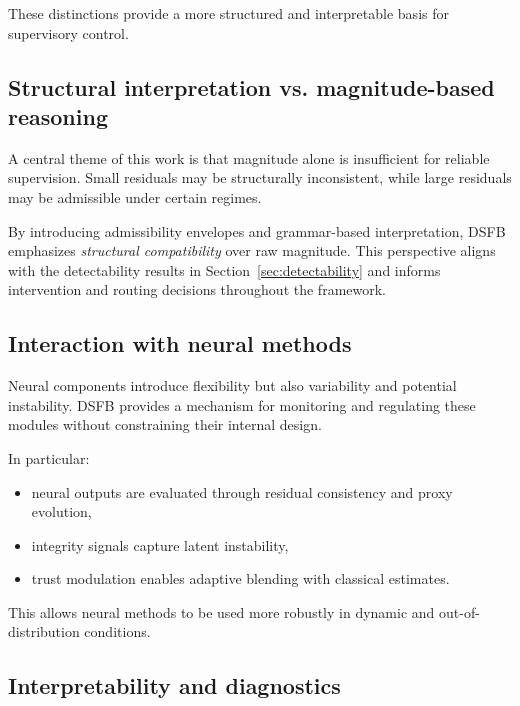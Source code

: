 \documentclass[11pt]{article}
\theoremstyle{definition}
\theoremstyle{plain}
\begin{document}
These distinctions provide a more structured and interpretable basis for supervisory control.


\subsection{Structural interpretation vs. magnitude-based reasoning}

A central theme of this work is that magnitude alone is insufficient for reliable supervision. Small residuals may be structurally inconsistent, while large residuals may be admissible under certain regimes.

By introducing admissibility envelopes and grammar-based interpretation, DSFB emphasizes \emph{structural compatibility} over raw magnitude. This perspective aligns with the detectability results in Section~\ref{sec:detectability} and informs intervention and routing decisions throughout the framework.


\subsection{Interaction with neural methods}

Neural components introduce flexibility but also variability and potential instability. DSFB provides a mechanism for monitoring and regulating these modules without constraining their internal design.

In particular:
\begin{itemize}[leftmargin=1.5em]
    \item neural outputs are evaluated through residual consistency and proxy evolution,
    \item integrity signals capture latent instability,
    \item trust modulation enables adaptive blending with classical estimates.
\end{itemize}

This allows neural methods to be used more robustly in dynamic and out-of-distribution conditions.


\subsection{Interpretability and diagnostics}
\end{document}

